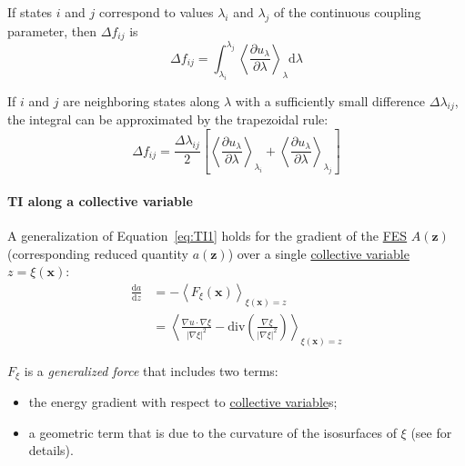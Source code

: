 \documentclass[9pt,review]{livecoms}
\newcommand{\vx}{\mathbf{x}}
\newcommand{\vz}{\mathbf{z}}
\begin{document}
If states $i$ and $j$ correspond to values $\lambda_i$ and $\lambda_j$ of the continuous coupling parameter, then $\Delta f_{ij}$ is
\begin{equation}
\Delta f_{ij} = \int_{\lambda_i}^{\lambda_j}  \left\langle \frac{\partial u_\lambda}{\partial \lambda} \right\rangle_\lambda \mathrm{d}\lambda
\label{eq:TI2}
\end{equation}

If $i$ and $j$ are neighboring states along $\lambda$ with a sufficiently small difference $\Delta \lambda_{ij}$, the integral can be approximated by the trapezoidal rule:
\begin{equation}
\Delta f_{ij} = \frac{\Delta \lambda_{ij}}{2}\left[\left\langle \frac{\partial u_\lambda}{\partial \lambda} \right\rangle_{\lambda_i} + \left\langle \frac{\partial u_\lambda}{\partial \lambda} \right\rangle_{\lambda_j}\right]
\label{eq:TI}
\end{equation}


\paragraph{TI along a collective variable}


A generalization of Equation~\ref{eq:TI1} holds for the gradient of the \hyperlink{ref:FES} {FES} $A(\vz)$ (corresponding reduced quantity $a(\vz)$) over a single \hyperlink{ref:CV} {collective variable} $z = \xi(\vx)$:
\begin{align}
\frac{\mathrm{d} a}{\mathrm{d} z} &= - \left\langle F_\xi(\vx)  \right\rangle_{\xi(\vx) = z}\\
&= \left\langle \frac{\nabla u \cdot \nabla \xi}{|\nabla \xi|^2}
-\mathrm{div}\left( \frac{\nabla \xi}{|\nabla \xi|^2} \right)
\right\rangle_{\xi(\vx)=z}
    \label{eq:TI_CV}
\end{align}

$F_\xi$ is a \textit{generalized force} that includes two terms:
\begin{itemize}
    \item the energy gradient with respect to \hyperlink{ref:CV} {collective variable}s;
    \item a geometric term that is due to the curvature of the isosurfaces of $\xi$ (see \cite{lelievre-rousset-stoltz-07-a, Henin2010a, Comer2015} for details).
\end{itemize}
\end{document}
